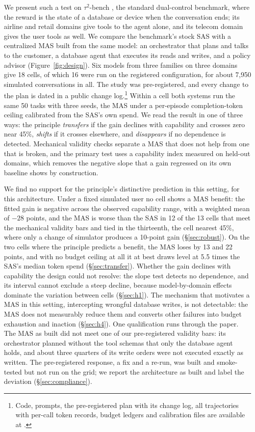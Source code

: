 We present such a test on $\tau^2$-bench \citep{barres2025tau2}, the standard dual-control benchmark, where the reward is the state of a database or device when the conversation ends; its airline and retail domains give tools to the agent alone, and its telecom domain gives the user tools as well. We compare the benchmark's stock SAS with a centralized MAS built from the same model: an orchestrator that plans and talks to the customer, a database agent that executes its reads and writes, and a policy advisor (Figure~\ref{fig:design}). Six models from three families on three domains give 18 cells, of which 16 were run on the registered configuration, for about 7,950 simulated conversations in all. The study was pre-registered, and every change to the plan is dated in a public change log.\footnote{Code, prompts, the pre-registered plan with its change log, all trajectories with per-call token records, budget ledgers and calibration files are available at .} Within a cell both systems run the same 50 tasks with three seeds, the MAS under a per-episode completion-token ceiling calibrated from the SAS's own spend. We read the result in one of three ways: the principle \emph{transfers} if the gain declines with capability and crosses zero near 45\%, \emph{shifts} if it crosses elsewhere, and \emph{disappears} if no dependence is detected. Mechanical validity checks separate a MAS that does not help from one that is broken, and the primary test uses a capability index measured on held-out domains, which removes the negative slope that a gain regressed on its own baseline shows by construction.

We find no support for the principle's distinctive prediction in this setting, for this architecture. Under a fixed simulated user no cell shows a MAS benefit: the fitted gain is negative across the observed capability range, with a weighted mean of $-28$ points, and the MAS is worse than the SAS in 12 of the 13 cells that meet the mechanical validity bars and tied in the thirteenth, the cell nearest 45\%, where only a change of simulator produces a 10-point gain (\S\ref{sec:robust}). On the two cells where the principle predicts a benefit, the MAS loses by 13 and 22 points, and with no budget ceiling at all it at best draws level at 5.5 times the SAS's median token spend (\S\ref{sec:transfer}). Whether the gain declines with capability the design could not resolve: the slope test detects no dependence, and its interval cannot exclude a steep decline, because model-by-domain effects dominate the variation between cells (\S\ref{sec:h1}). The mechanism that motivates a MAS in this setting, intercepting wrongful database writes, is not detectable: the MAS does not measurably reduce them and converts other failures into budget exhaustion and inaction (\S\ref{sec:h4}). One qualification runs through the paper. The MAS as built did not meet one of our pre-registered validity bars: its orchestrator planned without the tool schemas that only the database agent holds, and about three quarters of its write orders were not executed exactly as written. The pre-registered response, a fix and a re-run, was built and smoke-tested but not run on the grid; we report the architecture as built and label the deviation (\S\ref{sec:compliance}).

